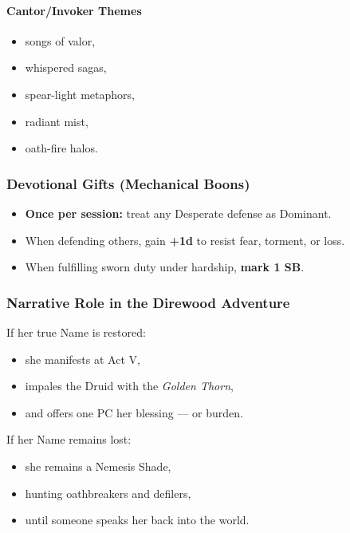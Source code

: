 \documentclass[11pt]{article}
\begin{document}
\paragraph*{Cantor/Invoker Themes}
\begin{itemize}
    \item songs of valor,
    \item whispered sagas,
    \item spear-light metaphors,
    \item radiant mist,
    \item oath-fire halos.
\end{itemize}

\subsubsection{Devotional Gifts (Mechanical Boons)}
\begin{itemize}
    \item \textbf{Once per session:} treat any Desperate defense as Dominant.
    \item When defending others, gain \textbf{+1d} to resist fear, torment, or loss.
    \item When fulfilling sworn duty under hardship, \textbf{mark 1 SB}.
\end{itemize}

\subsubsection{Narrative Role in the Direwood Adventure}
If her true Name is restored:
\begin{itemize}
    \item she manifests at Act V,
    \item impales the Druid with the \textit{Golden Thorn},
    \item and offers one PC her blessing --- or burden.
\end{itemize}

If her Name remains lost:
\begin{itemize}
    \item she remains a Nemesis Shade,
    \item hunting oathbreakers and defilers,
    \item until someone speaks her back into the world.
\end{itemize}
\end{document}
